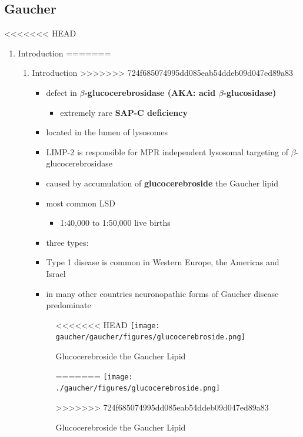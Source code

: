 \documentclass[fontsize=12pt]{scrartcl}
\begin{document}
\begin{enumerate}
\begin{enumerate}
\begin{enumerate}
\begin{enumerate}
\begin{table}[htbp]
\subsection{Gaucher}
<<<<<<< HEAD
\label{sec:org800826d}
\begin{enumerate}
\item Introduction
\label{sec:orgfceaa14}
=======
\label{sec:orgf68edf1}
\begin{enumerate}
\item Introduction
\label{sec:orgf78e990}
>>>>>>> 724f685074995dd085eab54ddeb09d047ed89a83
\begin{itemize}
\item defect in \textbf{\(\beta\)-glucocerebrosidase (AKA: acid \(\beta\)-glucosidase)}
\begin{itemize}
\item extremely rare \textbf{SAP-C deficiency}
\end{itemize}
\item located in the lumen of lysosomes
\item LIMP-2 is responsible for MPR independent lysosomal targeting of
\(\beta\)-glucocerebrosidase
\item caused by accumulation of \textbf{glucocerebroside} the Gaucher lipid
\item most common LSD
\begin{itemize}
\item 1:40,000 to 1:50,000 live births
\end{itemize}
\item three types:
\item Type 1 disease is common in Western Europe, the Americas and Israel
\item in many other countries neuronopathic forms of Gaucher disease predominate
\end{itemize}

\begin{figure}[htbp]
\centering
<<<<<<< HEAD
\texttt{[image: gaucher/gaucher/figures/glucocerebroside.png]}
\caption{\label{fig:org2a33d86}Glucocerebroside the Gaucher Lipid}
=======
\texttt{[image: ./gaucher/figures/glucocerebroside.png]}
\caption{\label{fig:org324bb28}
Glucocerebroside the Gaucher Lipid}
>>>>>>> 724f685074995dd085eab54ddeb09d047ed89a83
\end{figure}


\end{enumerate}
\end{enumerate}
\end{table}
\end{enumerate}
\end{enumerate}
\end{enumerate}
\end{enumerate}
\end{document}
